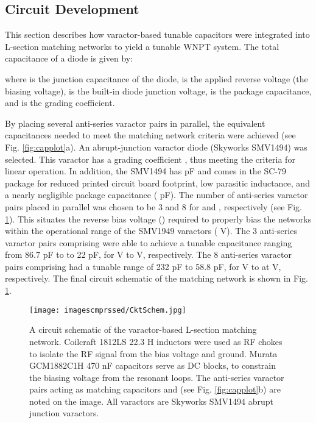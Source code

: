 \documentclass[journal]{IEEEtran}
\begin{document}
\subsection{Circuit Development}

This section describes how varactor-based tunable capacitors were integrated into L-section matching networks to yield a tunable WNPT system. The total capacitance of a diode is given by:

where  is the junction capacitance of the diode,  is the applied reverse voltage (the biasing voltage),  is the built-in diode junction voltage,  is the package capacitance, and  is the grading coefficient.

By placing several anti-series varactor pairs in parallel, the equivalent capacitances needed to meet the matching network criteria were achieved (see Fig. \ref{fig:capplot}a). An abrupt-junction varactor diode (Skyworks SMV1494) was selected. This varactor has a grading coefficient , thus meeting the criteria for linear operation. In addition, the SMV1494 has  pF and comes in the SC-79 package for reduced printed circuit board footprint, low parasitic inductance, and a nearly negligible package capacitance ( pF). The number of anti-series varactor pairs placed in parallel was chosen to be 3 and 8 for  and , respectively (see Fig. \ref{fig:CktSchem}). This situates the reverse bias voltage () required to properly bias the networks within the operational range of the SMV1949 varactors ( V). The 3 anti-series varactor pairs comprising  were able to achieve a tunable capacitance ranging from 86.7 pF to  to 22 pF, for  V to  V, respectively. The 8 anti-series varactor pairs comprising  had a tunable range of 232 pF to 58.8 pF, for  V to  at  V, respectively. The final circuit schematic of the matching network is shown in Fig. \ref{fig:CktSchem}.
\begin{figure}[htbp]
    \centering
    \texttt{[image: imagescmprssed/CktSchem.jpg]}
    \caption{A circuit schematic of the varactor-based L-section matching network. Coilcraft 1812LS 22.3 H inductors were used as RF chokes to isolate the RF signal from the bias voltage and ground. Murata GCM1882C1H 470 nF capacitors serve as DC blocks, to constrain the biasing voltage from the resonant loops. The anti-series varactor pairs acting as matching capacitors  and  (see Fig. \ref{fig:capplot}b) are noted on the image. All varactors are Skyworks SMV1494 abrupt junction varactors.}
    \label{fig:CktSchem}
\end{figure}
\end{document}
